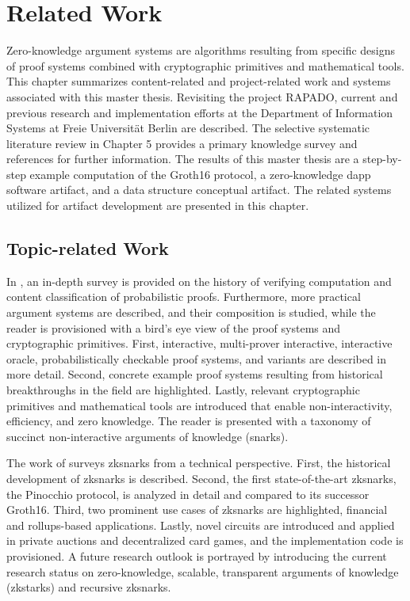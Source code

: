 \chapter{Related Work}
Zero-knowledge argument systems are algorithms resulting from specific designs of proof systems combined with cryptographic primitives and mathematical tools. This chapter summarizes content-related and project-related work and systems associated with this master thesis. Revisiting the project RAPADO, current and previous research and implementation efforts at the Department of Information Systems at Freie Universit{\"a}t Berlin are described. The selective systematic literature review in Chapter 5 provides a primary knowledge survey and references for further information. The results of this master thesis are a step-by-step example computation of the Groth16 protocol, a zero-knowledge \acrshort{dapp} software artifact, and a data structure conceptual artifact. The related systems utilized for artifact development are presented in this chapter.

\section{Topic-related Work}
In \citet{Thaler}, an in-depth survey is provided on the history of verifying computation and content classification of probabilistic proofs. Furthermore, more practical argument systems are described, and their composition is studied, while the reader is provisioned with a bird's eye view of the proof systems and cryptographic primitives. First, interactive, multi-prover interactive, interactive oracle, probabilistically checkable proof systems, and variants are described in more detail. Second, concrete example proof systems resulting from historical breakthroughs in the field are highlighted. Lastly, relevant cryptographic primitives and mathematical tools are introduced that enable non-interactivity, efficiency, and zero knowledge. The reader is presented with a taxonomy of succinct non-interactive arguments of knowledge (\acrshort{snark}s).

The work of \citet{chen2022review} surveys \acrshort{zksnark}s from a technical perspective. First, the historical development of \acrshort{zksnark}s is described. Second, the first state-of-the-art \acrshort{zksnark}s, the Pinocchio protocol, is analyzed in detail and compared to its successor Groth16. Third, two prominent use cases of \acrshort{zksnark}s are highlighted, financial and rollups-based applications. Lastly, novel circuits are introduced and applied in private auctions and decentralized card games, and the implementation code is provisioned. A future research outlook is portrayed by introducing the current research status on zero-knowledge, scalable, transparent arguments of knowledge (\acrshort{zkstark}s) and recursive \acrshort{zksnark}s.

